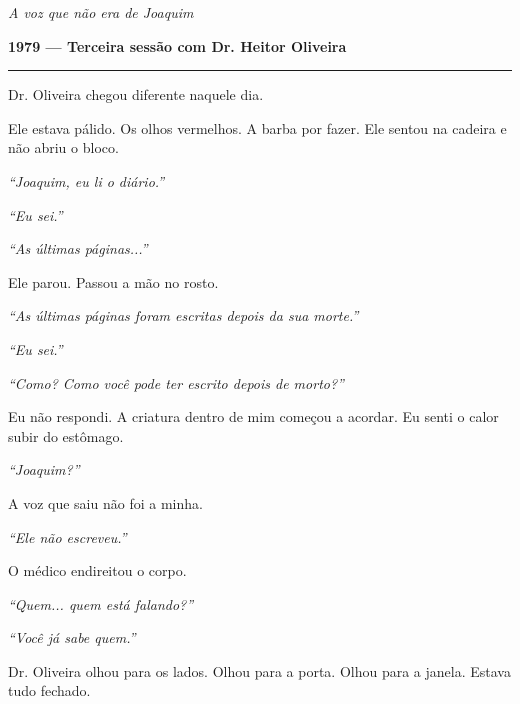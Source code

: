 
\noindent \textit{A voz que não era de Joaquim}

\noindent \textbf{1979 --- Terceira sessão com Dr. Heitor Oliveira}

\vspace{0.5em}\noindent\rule{\textwidth}{0.5pt}\vspace{0.5em}

\noindent Dr. Oliveira chegou diferente naquele dia.

\noindent Ele estava pálido. Os olhos vermelhos. A barba por fazer. Ele sentou na cadeira e não abriu o bloco.

\noindent \textit{\textquotedblleft{}Joaquim, eu li o diário.\textquotedblright{}}

\noindent \textit{\textquotedblleft{}Eu sei.\textquotedblright{}}

\noindent \textit{\textquotedblleft{}As últimas páginas...\textquotedblright{}}

\noindent Ele parou. Passou a mão no rosto.

\noindent \textit{\textquotedblleft{}As últimas páginas foram escritas depois da sua morte.\textquotedblright{}}

\noindent \textit{\textquotedblleft{}Eu sei.\textquotedblright{}}

\noindent \textit{\textquotedblleft{}Como? Como você pode ter escrito depois de morto?\textquotedblright{}}

\noindent Eu não respondi. A criatura dentro de mim começou a acordar. Eu senti o calor subir do estômago.

\noindent \textit{\textquotedblleft{}Joaquim?\textquotedblright{}}

\noindent A voz que saiu não foi a minha.

\noindent \textit{\textquotedblleft{}Ele não escreveu.\textquotedblright{}}

\noindent O médico endireitou o corpo.

\noindent \textit{\textquotedblleft{}Quem... quem está falando?\textquotedblright{}}

\noindent \textit{\textquotedblleft{}Você já sabe quem.\textquotedblright{}}

\noindent Dr. Oliveira olhou para os lados. Olhou para a porta. Olhou para a janela. Estava tudo fechado.

